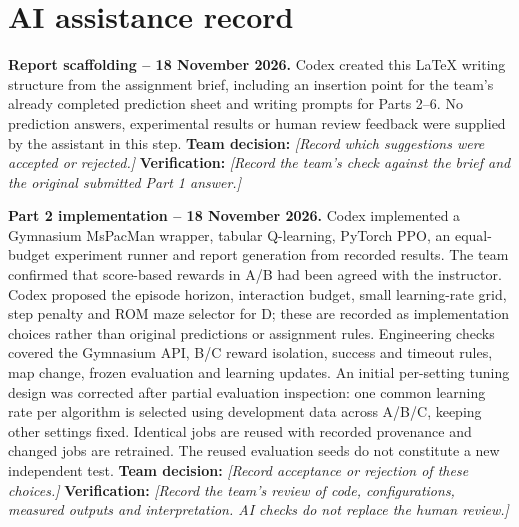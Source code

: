 \section*{AI assistance record}

\noindent\textbf{Report scaffolding -- 18 November 2026.}
Codex created this LaTeX writing structure from the assignment brief, including
an insertion point for the team's already completed prediction sheet and
writing prompts for Parts 2--6. No prediction answers, experimental results or
human review feedback were supplied by the assistant in this step.
\textbf{Team decision:} \textit{[Record which suggestions were accepted or rejected.]}
\textbf{Verification:} \textit{[Record the team's check against the brief and the
original submitted Part 1 answer.]}


\medskip
\noindent\textbf{Part 2 implementation -- 18 November 2026.}
Codex implemented a Gymnasium MsPacMan wrapper, tabular Q-learning, PyTorch PPO,
an equal-budget experiment runner and report generation from recorded results.
The team confirmed that score-based rewards in A/B had been agreed with the
instructor. Codex proposed the episode horizon, interaction budget, small
learning-rate grid, step penalty and ROM maze selector for D; these are recorded
as implementation choices rather than original predictions or assignment rules.
Engineering checks covered the Gymnasium API, B/C reward isolation, success and
timeout rules, map change, frozen evaluation and learning updates.
An initial per-setting tuning design was corrected after partial evaluation
inspection: one common learning rate per algorithm is selected using development
data across A/B/C, keeping other settings fixed. Identical jobs are reused with
recorded provenance and changed jobs are retrained. The reused evaluation seeds
do not constitute a new independent test.
\textbf{Team decision:} \textit{[Record acceptance or rejection of these choices.]}
\textbf{Verification:} \textit{[Record the team's review of code, configurations,
measured outputs and interpretation. AI checks do not replace the human review.]}


